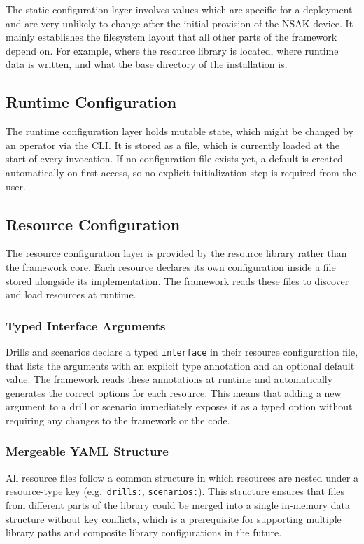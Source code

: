 The static configuration layer involves values which are specific for a deployment and are very unlikely to change after the initial provision of the \gls{NSAK} device.
It mainly establishes the filesystem layout that all other parts of the framework depend on.
For example, where the resource library is located, where runtime data is written, and what the base directory of the installation is.

\subsection{Runtime Configuration}\label{subsec:runtime-configuration-concept}

The runtime configuration layer holds mutable state, which might be changed by an operator via the \gls{CLI}.
It is stored as a  file, which is currently loaded at the start of every invocation.
If no configuration file exists yet, a default is created automatically on first access, so no explicit initialization step is required from the user.

\subsection{Resource Configuration}\label{subsec:resource-configuration-concept}
The resource configuration layer is provided by the resource library rather than the framework core.
Each resource declares its own configuration inside a  file stored alongside its implementation.
The framework reads these files to discover and load resources at runtime.

\subsubsection{Typed Interface Arguments}\label{subsubsec:typed-interface-arguments}
Drills and scenarios declare a typed \texttt{interface} in their resource configuration  file, that lists the arguments with an explicit type annotation and an optional default value.
The framework reads these annotations at runtime and automatically generates the correct  options for each resource.
This means that adding a new argument to a drill or scenario immediately exposes it as a typed  option without requiring any changes to the framework or the  code.

\subsubsection{Mergeable YAML Structure}\label{subsubsec:mergeable-yaml-structure}
All resource  files follow a common structure in which resources are nested under a resource-type key (e.g.\ \texttt{drills:}, \texttt{scenarios:}).
This structure ensures that  files from different parts of the library could be merged into a single in-memory data structure without key conflicts, which is a prerequisite for supporting multiple library paths and composite library configurations in the future.

